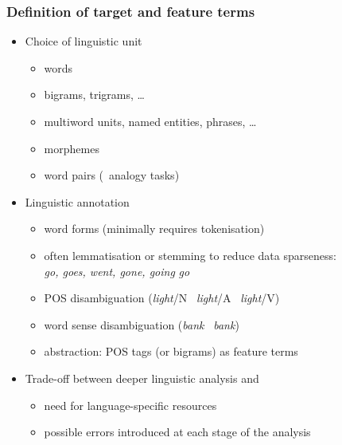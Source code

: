 \documentclass[t]{beamer} %
\begin{document}
\begin{frame}
  \frametitle{Definition of target and feature terms}

  \ungap
  \begin{itemize}
  \item Choice of linguistic unit
    \begin{itemize}
    \item words
    \item bigrams, trigrams, \ldots
    \item multiword units, named entities, phrases, \ldots
    \item morphemes
    \item word pairs (\hand\ analogy tasks)
    \end{itemize}
  \item<2-> Linguistic annotation
    \begin{itemize}
    \item word forms (minimally requires tokenisation)
    \item often lemmatisation or stemming to reduce data sparseness:\\
      \emph{go, goes, went, gone, going} \so \emph{go}
    \item POS disambiguation (\emph{light}/N \vs\ \emph{light}/A \vs\ \emph{light}/V)
    \item word sense disambiguation (\emph{bank} \vs\ \emph{bank})
    \item abstraction: POS tags (or bigrams) as feature terms
    \end{itemize}
  \item<3-> Trade-off between deeper linguistic analysis and
    \begin{itemize}
    \item need for language-specific resources
    \item possible errors introduced at each stage of the analysis
    \end{itemize}
  \end{itemize}
\end{frame}
\end{document}
